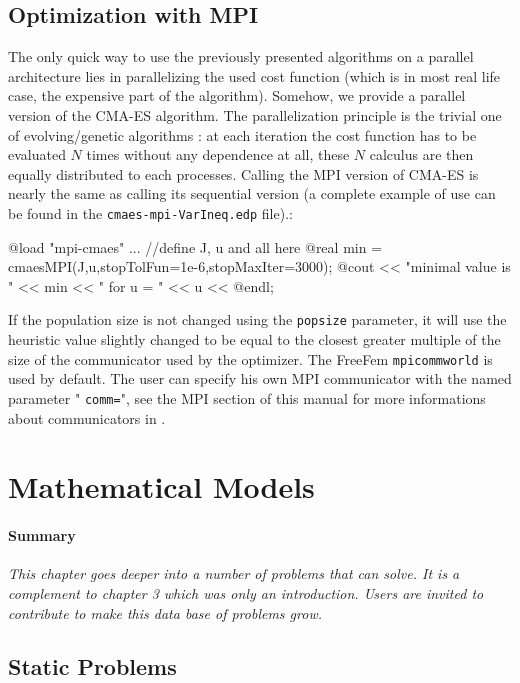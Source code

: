 \documentclass[a4paper,twoside,12pt]{book}
\begin{document}
\subsection{Optimization with MPI}
The only quick way to use the previously presented algorithms on a parallel architecture lies in parallelizing the used cost function (which is in most real life case, the expensive part of the algorithm).
 Somehow, we provide a parallel version of the CMA-ES algorithm. The parallelization principle is the trivial one of evolving/genetic algorithms : at each iteration the cost function has to be evaluated $N$ 
 times without any dependence at all, these $N$ calculus are then equally distributed to each processes. Calling the MPI version of CMA-ES is nearly the same as calling its sequential version (a 
 complete example of use can be found in the \texttt{cmaes-mpi-VarIneq.edp} file).:

\bFF
  @load "mpi-cmaes"
  ... //define J, u and all here
  @real min = cmaesMPI(J,u,stopTolFun=1e-6,stopMaxIter=3000);
  @cout << "minimal value is " << min << " for u = " << u << @endl;
\eFF

If the population size is not changed using the {\tt popsize} parameter, it will use the heuristic value slightly changed to be equal to the closest greater multiple of the size of the communicator used by 
the optimizer. 
The FreeFem {\tt mpicommworld} is used by default. The user can specify his own MPI communicator with the named parameter "{ \tt comm=}", see the MPI section of this manual for more informations about 
communicators in \freefempp.



\section{Mathematical Models}
\label{sec:MathModels}
\paragraph{Summary}\emph{This chapter goes deeper into a number of problems that \freefempp can solve.  It is a complement to
chapter 3 which was only an introduction.  Users are invited to contribute to make this data base
of problems grow.}

\subsection{Static Problems}
\end{document}
